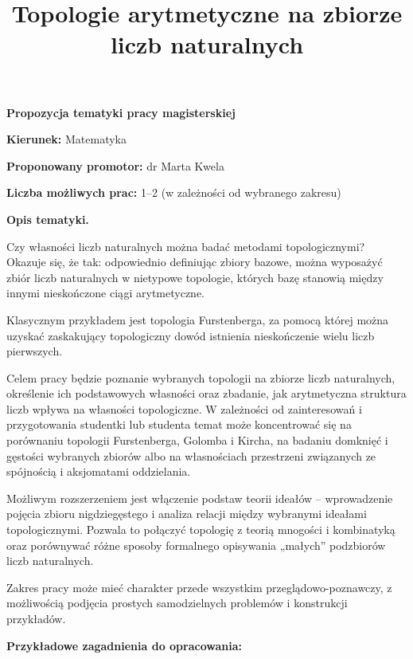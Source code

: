 \documentclass[12pt,a4paper]{article}
\title{\textbf{Topologie arytmetyczne na zbiorze liczb naturalnych}}
\author{}
\date{}
\begin{document}
\maketitle

\begin{center}
\textbf{Propozycja tematyki pracy magisterskiej}
\end{center}

\noindent
\textbf{Kierunek:} Matematyka

\noindent
\textbf{Proponowany promotor:} dr Marta Kwela

\noindent
\textbf{Liczba możliwych prac:} 1--2 (w zależności od wybranego zakresu)

\bigskip

\noindent
\textbf{Opis tematyki.}

Czy własności liczb naturalnych można badać metodami topologicznymi?
Okazuje się, że tak: odpowiednio definiując zbiory bazowe, można wyposażyć
zbiór liczb naturalnych w nietypowe topologie, których bazę stanowią między
innymi nieskończone ciągi arytmetyczne.

Klasycznym przykładem jest topologia Furstenberga, za pomocą której można
uzyskać zaskakujący topologiczny dowód istnienia nieskończenie wielu liczb
pierwszych.

Celem pracy będzie poznanie wybranych topologii na zbiorze liczb naturalnych,
określenie ich podstawowych własności oraz zbadanie, jak arytmetyczna
struktura liczb wpływa na własności topologiczne. W zależności od
zainteresowań i przygotowania studentki lub studenta temat może
koncentrować się na porównaniu topologii Furstenberga, Golomba i Kircha,
na badaniu domknięć i gęstości wybranych zbiorów albo na własnościach
przestrzeni związanych ze spójnością i aksjomatami oddzielania.

Możliwym rozszerzeniem jest włączenie podstaw teorii ideałów -- wprowadzenie
pojęcia zbioru nigdziegęstego i analiza relacji między wybranymi ideałami
topologicznymi. Pozwala to połączyć topologię z teorią mnogości i
kombinatyką oraz porównywać różne sposoby formalnego opisywania
„małych” podzbiorów liczb naturalnych.

Zakres pracy może mieć charakter przede wszystkim przeglądowo-poznawczy,
z możliwością podjęcia prostych samodzielnych problemów i konstrukcji
przykładów.

\bigskip

\noindent
\textbf{Przykładowe zagadnienia do opracowania:}
\end{document}
